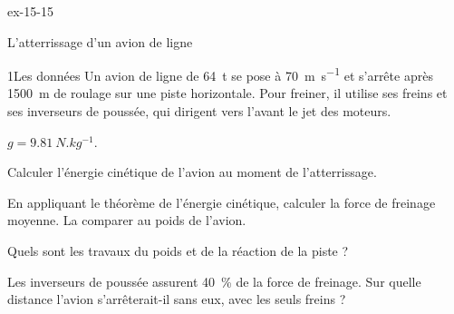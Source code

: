 \begin{blocLivre}{ex-15-15}
\begin{exercice}[3]{L'atterrissage d'un avion de ligne}
\begin{docu}{1}{Les données}
Un avion de ligne de \qty{64}{t} se pose à \qty{70}{m.s^{-1}} et s'arrête après \qty{1500}{m} de roulage sur une piste horizontale. Pour freiner, il utilise ses
freins et ses inverseurs de poussée, qui dirigent vers l'avant le jet des moteurs.
\end{docu}
\begin{donnees}
$g=\qty{9,81}{N.kg^{-1}}$.
\end{donnees}
\begin{questions}
\item Calculer l'énergie cinétique de l'avion au moment de l'atterrissage.
\item En appliquant le théorème de l'énergie cinétique, calculer la force de freinage moyenne. La comparer au poids de l'avion.
\item Quels sont les travaux du poids et de la réaction de la piste ?
\item \initiative Les inverseurs de poussée assurent \qty{40}{\percent} de la force de freinage. Sur quelle distance l'avion s'arrêterait-il sans eux, avec les
seuls freins ?
\end{questions}
\end{exercice}
\end{blocLivre}
